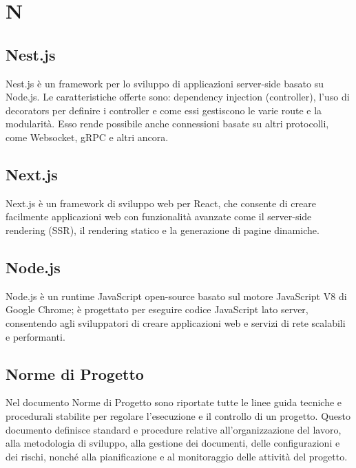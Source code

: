 \section*{N} 
\subsection*{Nest.js} 
Nest.js è un framework per lo sviluppo di applicazioni server-side basato su Node.js. Le caratteristiche offerte sono: dependency injection (controller), l'uso di decorators per definire i controller e come essi gestiscono le varie route e la modularità. Esso rende possibile anche connessioni basate su altri protocolli, come Websocket, gRPC e altri ancora.
\subsection*{Next.js} 
Next.js è un framework di sviluppo web per React, che consente di creare facilmente applicazioni web con funzionalità avanzate come il server-side rendering (SSR), il rendering statico e la generazione di pagine dinamiche.
\subsection*{Node.js} 
Node.js è un runtime JavaScript open-source basato sul motore JavaScript V8 di Google Chrome; è progettato per eseguire codice JavaScript lato server, consentendo agli sviluppatori di creare applicazioni web e servizi di rete scalabili e performanti.
\subsection*{Norme di Progetto} 
Nel documento Norme di Progetto sono riportate tutte le linee guida tecniche e procedurali stabilite per regolare l'esecuzione e il controllo di un progetto. Questo documento definisce standard e procedure relative all'organizzazione del lavoro, alla metodologia di sviluppo, alla gestione dei documenti, delle configurazioni e dei rischi, nonché alla pianificazione e al monitoraggio delle attività del progetto.
